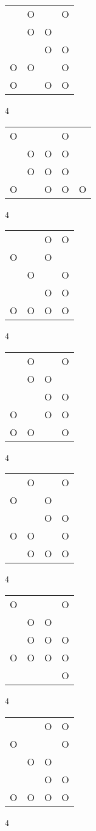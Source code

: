 \begin{tabular}{|m{0.2cm}m{0.2cm}m{0.2cm}m{0.2cm}|}\hline
 &O& &O\\
 &O&O& \\
 & &O&O\\
O&O& &O\\
O& &O&O\\
\hline\end{tabular}4
\begin{tabular}{|m{0.2cm}m{0.2cm}m{0.2cm}m{0.2cm}m{0.2cm}|}\hline
O& & &O& \\
 &O&O&O& \\
 &O&O&O& \\
O& &O&O&O\\
\hline\end{tabular}4
\begin{tabular}{|m{0.2cm}m{0.2cm}m{0.2cm}m{0.2cm}|}\hline
 & &O&O\\
O& &O& \\
 &O& &O\\
 & &O&O\\
O&O&O&O\\
\hline\end{tabular}4
\begin{tabular}{|m{0.2cm}m{0.2cm}m{0.2cm}m{0.2cm}|}\hline
 &O& &O\\
 &O&O& \\
 & &O&O\\
O& &O&O\\
O&O& &O\\
\hline\end{tabular}4
\begin{tabular}{|m{0.2cm}m{0.2cm}m{0.2cm}m{0.2cm}|}\hline
 &O& &O\\
O& &O& \\
 & &O&O\\
O&O& &O\\
 &O&O&O\\
\hline\end{tabular}4
\begin{tabular}{|m{0.2cm}m{0.2cm}m{0.2cm}m{0.2cm}|}\hline
O& & &O\\
 &O&O& \\
 &O&O&O\\
O&O&O&O\\
 & & &O\\
\hline\end{tabular}4
\begin{tabular}{|m{0.2cm}m{0.2cm}m{0.2cm}m{0.2cm}|}\hline
 & &O&O\\
O& & &O\\
 &O&O& \\
 & &O&O\\
O&O&O&O\\
\hline\end{tabular}4

